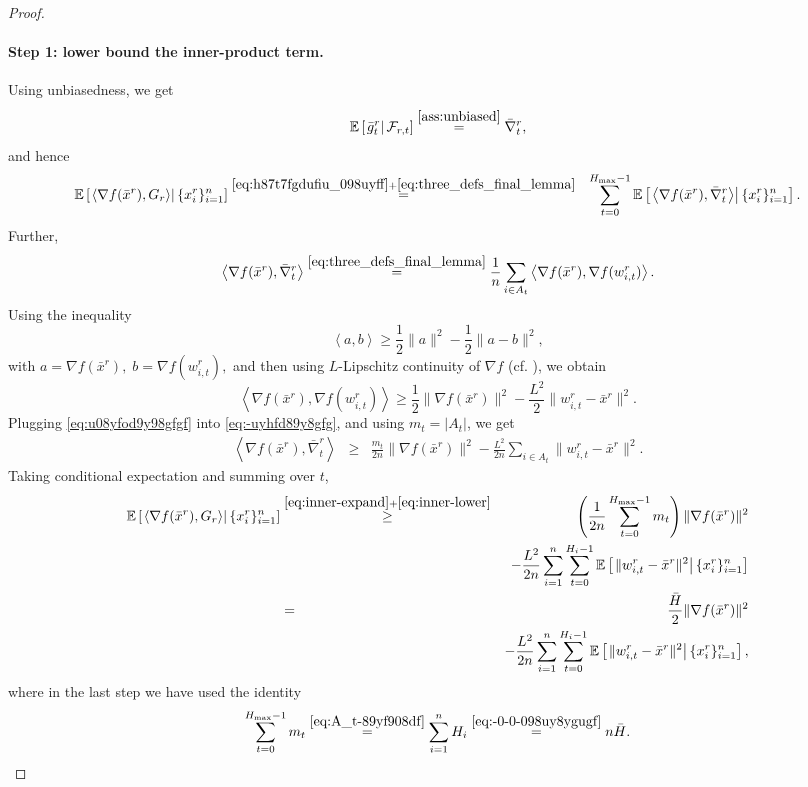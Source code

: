 \documentclass{article}
\newcommand{\anglebr}[1]{\left\langle#1\right\rangle} %
\newcommand{\inner}[2]{\anglebr{#1, #2}}
\newcommand{\cF}{\mathcal{F}}
\newcommand{\ExpCond}[2]{{\mathbb{E}}\left[\left.#1\right\vert#2\right]}
\theoremstyle{plain}
\theoremstyle{definition}
\begin{document}
\begin{proof}
\paragraph{Step 1: lower bound the inner-product term.}
Using unbiasedness, we get
\begin{equation}\label{eq:h87t7fgdufiu_098uyff}
\ExpCond{ \bar g_t^r }{ \cF_{r,t} } \overset{\Cref{ass:unbiased}}{=} \bar\nabla_t^r,
\end{equation}
and hence
\begin{eqnarray}
\ExpCond{ \inner{\nabla f(\bar x^r)}{G_r} }{ \{x_i^r\}_{i=1}^n }
&\overset{\eqref{eq:h87t7fgdufiu_098uyff}+\eqref{eq:three_defs_final_lemma}}{=}&
\sum_{t=0}^{H_{\max}-1}
\ExpCond{ \inner{\nabla f(\bar x^r)}{\bar\nabla_t^r} }{ \{x_i^r\}_{i=1}^n }.
\label{eq:inner-expand}
\end{eqnarray}
Further, 
\begin{equation}\label{eq:-uyhfd89y8gfg}
\inner{\nabla f(\bar x^r)}{\bar\nabla_t^r}
\overset{\eqref{eq:three_defs_final_lemma}}{=}
\frac{1}{n}\sum_{i\in A_t}
\inner{\nabla f(\bar x^r)}{\nabla f(w_{i,t}^r)}.
\end{equation}
Using the inequality
\[
\inner{a}{b}
\ge
\frac{1}{2}\|a\|^2-\frac{1}{2}\|a-b\|^2,
\]
with
\(
a=\nabla f(\bar x^r),\;
b=\nabla f(w_{i,t}^r),
\)
and then using \(L\)-Lipschitz continuity of \(\nabla f\) (cf. ), we obtain
\begin{equation}\label{eq:u08yfod9y98gfgf}
\inner{\nabla f(\bar x^r)}{\nabla f(w_{i,t}^r)}
\ge
\frac{1}{2}\|\nabla f(\bar x^r)\|^2
-
\frac{L^2}{2}\|w_{i,t}^r-\bar x^r\|^2.
\end{equation}
Plugging \eqref{eq:u08yfod9y98gfgf} into \eqref{eq:-uyhfd89y8gfg}, and using $m_t = |A_t|$, we get
\begin{eqnarray}
\inner{\nabla f(\bar x^r)}{\bar\nabla_t^r}
&\ge&
\frac{m_t}{2n}\|\nabla f(\bar x^r)\|^2
-
\frac{L^2}{2n}\sum_{i\in A_t}\|w_{i,t}^r-\bar x^r\|^2.
\label{eq:inner-lower}
\end{eqnarray}
Taking conditional expectation and summing over \(t\),
\begin{eqnarray}
\ExpCond{ \inner{\nabla f(\bar x^r)}{G_r} }{ \{x_i^r\}_{i=1}^n }
&\overset{\eqref{eq:inner-expand}+\eqref{eq:inner-lower}}{\ge}&
\left(\frac1{2n}\sum_{t=0}^{H_{\max}-1}m_t\right)\|\nabla f(\bar x^r)\|^2
\notag\\
&&
-
\frac{L^2}{2n}
\sum_{i=1}^n\sum_{t=0}^{H_i-1}
\ExpCond{ \|w_{i,t}^r-\bar x^r\|^2 }{ \{x_i^r\}_{i=1}^n } \notag \\
&=&\frac{\bar H}{2}\|\nabla f(\bar x^r)\|^2
\notag\\
&&
-
\frac{L^2}{2n}
\sum_{i=1}^n\sum_{t=0}^{H_i-1}
\ExpCond{ \|w_{i,t}^r-\bar x^r\|^2 }{ \{x_i^r\}_{i=1}^n } ,
\label{eq:inner-before-distance}
\end{eqnarray}
where in the last step we have used the identity
\[
\sum_{t=0}^{H_{\max}-1}m_t
\overset{\eqref{eq:A_t-89yf908df}}{=}
\sum_{i=1}^n H_i
\overset{\eqref{eq:-0-0-098uy8ygugf}}{=}
n\bar H.
\]



\end{proof}
\end{document}
